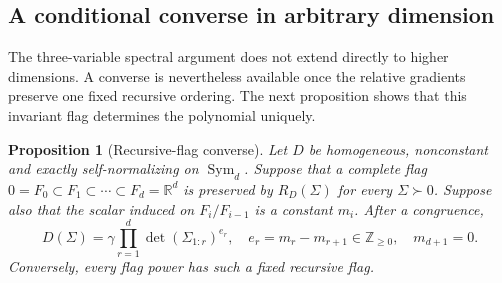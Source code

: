 \documentclass[12pt,a4paper]{article}
\theoremstyle{plain}
\newtheorem{proposition}{Proposition}
\theoremstyle{definition}
\newcommand{\R}{\mathbb{R}}
\newcommand{\Sym}{\operatorname{Sym}}
\begin{document}
\subsection{A conditional converse in arbitrary dimension}
\label{supp:recursive-flag-converse}

The three-variable spectral argument does not extend directly to higher dimensions.
A converse is nevertheless available once the relative gradients preserve one fixed recursive ordering.
The next proposition shows that this invariant flag determines the polynomial uniquely.

\begin{proposition}[Recursive-flag converse]
\label{prop:recursive-flag}
    Let $D$ be homogeneous, nonconstant and exactly self-normalizing on $\Sym_d$.
    Suppose that a complete flag $0=F_0\subset F_1\subset\cdots\subset F_d=\R^d$ is preserved by $R_D(\Sigma)$ for every $\Sigma\succ0$.
    Suppose also that the scalar induced on $F_i/F_{i-1}$ is a constant $m_i$.
    After a congruence,
    \begin{equation*}
        D(\Sigma)
        =
        \gamma\prod_{r=1}^d\det(\Sigma_{1:r})^{e_r}
        ,
        \quad
        e_r=m_r-m_{r+1}\in\mathbb{Z}_{\ge0}
        ,
        \quad
        m_{d+1}=0
        .
    \end{equation*}
    Conversely, every flag power has such a fixed recursive flag.
\end{proposition}
\end{document}
